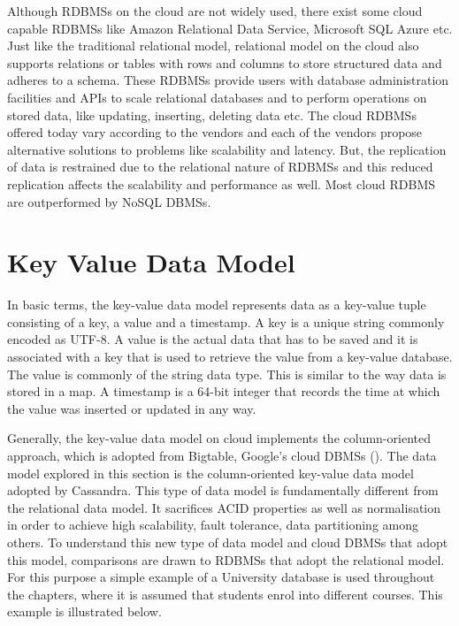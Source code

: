 Although \acp{RDBMS} on the cloud are not widely used,   there exist some cloud
capable \acp{RDBMS} like Amazon Relational Data Service,   Microsoft SQL Azure
etc.  Just like the traditional relational model,   relational model on the cloud
also supports relations or tables with rows and columns to store structured data
and adheres to a schema.  These \acp{RDBMS} provide users with database
administration facilities and APIs to scale relational databases and to perform
operations on stored data,   like updating,   inserting,   deleting data etc.  The
cloud \acp{RDBMS} offered today vary according to the vendors and each of the vendors
propose alternative solutions to problems like scalability and latency.  But,   the
replication of data is restrained due to the relational nature of \acp{RDBMS} and this reduced
replication affects the scalability and performance as well.  Most cloud
\ac{RDBMS} are outperformed by \ac{NoSQL} \acp{DBMS}. 

\section{Key Value Data Model}\label{s:key-value-data-model}
In basic terms,   the key-value data model represents data as a key-value tuple
consisting of a key,   a value and a timestamp.  A key is a unique string commonly
encoded as UTF-8.  A value is the actual data that has to be saved and it is
associated with a key that is used to retrieve the value from a key-value
database.  The value is commonly of the string data type. 
This is similar to the way data is stored in a map.  A timestamp is a 64-bit
integer that records the time at which the value was inserted or updated in
any way. 

Generally,   the key-value data model on cloud implements the column-oriented
approach,   which is adopted from Bigtable,   Google's cloud \acp{DBMS} ().  The data model explored in this section is the column-oriented key-value
data model adopted by Cassandra.  This type of data model is fundamentally
different from the relational data model.  It sacrifices ACID properties as well
as normalisation in order to achieve high scalability,   fault tolerance,   data
partitioning among others.  To understand this new type of data model and cloud
\acp{DBMS} that adopt this model,   comparisons are drawn to \acp{RDBMS} that
adopt the relational model.  For this purpose a simple
example of a University database is used throughout the chapters,   where it
is assumed that students enrol into different courses.  This example is
illustrated below. 


